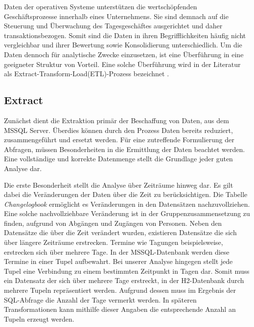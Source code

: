Daten der operativen Systeme unterstützen die wertschöpfenden Geschäftsprozesse innerhalb eines Unternehmens. Sie sind demnach auf die Steuerung und Überwachung des Tagesgeschäftes ausgerichtet und daher transaktionsbezogen. Somit sind die Daten in ihren Begrifflichkeiten häufig nicht vergleichbar und ihrer Bewertung sowie Konsolidierung unterschiedlich. Um die Daten dennoch für analytische Zwecke einzusetzen, ist eine Überführung in eine geeigneter Struktur von Vorteil. Eine solche Überführung wird in der Literatur als Extract-Transform-Load(ETL)-Prozess bezeichnet \cite{ElSappagh201191}. 

\subsection{Extract}

Zunächst dient die Extraktion primär der Beschaffung von Daten, aus dem MSSQL Server. Überdies können durch den Prozess Daten bereits reduziert,  zusammengeführt und ersetzt werden. Für eine zutreffende Formulierung der Abfragen, müssen Besonderheiten in die Ermittlung der Daten beachtet werden. Eine vollständige und korrekte Datenmenge stellt die Grundlage jeder guten Analyse dar.

Die erste Besonderheit stellt die Analyse über Zeiträume hinweg dar. Es gilt dabei die Veränderungen der Daten über die Zeit zu berücksichtigen. Die Tabelle  \textit{Changelogbook} ermöglicht es Veränderungen in den Datensätzen nachzuvollziehen. Eine solche nachvollziehbare Veränderung ist in der Gruppenzusammensetzung zu finden, aufgrund von Abgängen und Zugängen von Personen. Neben den Datensätze die über die Zeit verändert wurden, existieren Datensätze die sich über längere Zeiträume erstrecken. Termine wie Tagungen beispielsweise, erstrecken sich über mehrere Tage. In der MSSQL-Datenbank werden diese Termine in einer Tupel aufbewahrt. Bei unserer Analyse hingegen stellt jede Tupel eine Verbindung zu einem bestimmten Zeitpunkt in Tagen dar. Somit muss ein Datensatz der sich über mehrere Tage erstreckt, in der H2-Datenbank durch mehrere Tupeln repräsentiert werden. Aufgrund dessen muss im Ergebnis der SQL-Abfrage die Anzahl der Tage vermerkt werden. In späteren Transformationen kann mithilfe dieser Angaben die entsprechende Anzahl an Tupeln erzeugt werden.

